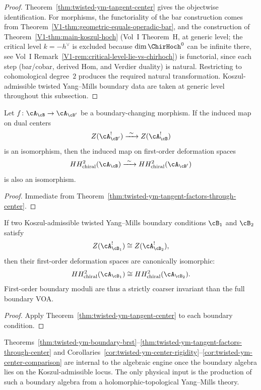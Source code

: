 \begin{proof}
Theorem~\ref{thm:twisted-ym-tangent-center} gives the objectwise identification.
For morphisms, the functoriality of the bar construction comes from
Theorem~\ref{V1-thm:geometric-equals-operadic-bar},
and the construction of Theorem~\ref{V1-thm:main-koszul-hoch} (Vol~I Theorem~H, at generic level;
the critical level $k = -h^\vee$ is excluded because $\dim \ChirHoch^0$ can be infinite there,
see Vol~I Remark~\ref*{V1-rem:critical-level-lie-vs-chirhoch}) is functorial, since each step (bar/cobar, derived $\mathrm{Hom}$, and Verdier duality) is natural. Restricting to
cohomological degree~$2$ produces the required natural transformation. Koszul-admissible
twisted Yang--Mills boundary data are taken at generic level throughout this subsection.
\end{proof}

\begin{corollary}
\label{cor:twisted-ym-interface-invariance}
Let $f \colon \cA_{\cB} \to \cA_{\cB'}$ be a boundary-changing morphism.
If the induced map on dual centers
\[
Z(\cA_{\cB'}^!) \xrightarrow{\ \sim\ } Z(\cA_{\cB}^!)
\]
is an isomorphism, then the induced map on first-order deformation spaces
\[
HH^2_{\mathrm{chiral}}(\cA_{\cB}) \xrightarrow{\ \sim\ } HH^2_{\mathrm{chiral}}(\cA_{\cB'})
\]
is also an isomorphism.
\end{corollary}

\begin{proof}
Immediate from Theorem~\ref{thm:twisted-ym-tangent-factors-through-center}.
\end{proof}

\begin{corollary}
\label{cor:twisted-ym-center-comparison}
If two Koszul-admissible twisted Yang--Mills boundary conditions $\cB_1$ and $\cB_2$ satisfy
\[
Z(\cA_{\cB_1}^!) \cong Z(\cA_{\cB_2}^!),
\]
then their first-order deformation spaces are canonically isomorphic:
\[
HH^2_{\mathrm{chiral}}(\cA_{\cB_1}) \cong HH^2_{\mathrm{chiral}}(\cA_{\cB_2}).
\]
First-order boundary moduli are thus a strictly coarser invariant than the full
boundary VOA.
\end{corollary}

\begin{proof}
Apply Theorem~\ref{thm:twisted-ym-tangent-center} to each boundary condition.
\end{proof}

\begin{remark}
\label{rem:twisted-ym-math-vs-physics}
Theorems~\ref{thm:twisted-ym-boundary-brst}--\ref{thm:twisted-ym-tangent-factors-through-center}
and Corollaries~\ref{cor:twisted-ym-center-rigidity}--\ref{cor:twisted-ym-center-comparison}
are internal to the algebraic engine once the boundary algebra lies on
the Koszul-admissible locus. The only physical input is the production of such a
boundary algebra from a holomorphic-topological Yang--Mills theory.
\end{remark}


